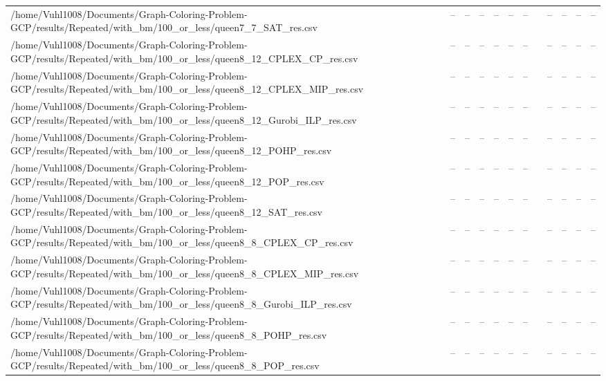 \begin{table}[htbp]
\begin{tabular}{llllllllllll}
/home/Vuhl1008/Documents/Graph-Coloring-Problem-GCP/results/Repeated/with\_bm/100\_or\_less/queen7\_7\_SAT\_res.csv & -- & -- & -- & -- & -- & -- & {} & -- & -- & -- & -- \\
/home/Vuhl1008/Documents/Graph-Coloring-Problem-GCP/results/Repeated/with\_bm/100\_or\_less/queen8\_12\_CPLEX\_CP\_res.csv & -- & -- & -- & -- & -- & -- & {} & -- & -- & -- & -- \\
/home/Vuhl1008/Documents/Graph-Coloring-Problem-GCP/results/Repeated/with\_bm/100\_or\_less/queen8\_12\_CPLEX\_MIP\_res.csv & -- & -- & -- & -- & -- & -- & {} & -- & -- & -- & -- \\
/home/Vuhl1008/Documents/Graph-Coloring-Problem-GCP/results/Repeated/with\_bm/100\_or\_less/queen8\_12\_Gurobi\_ILP\_res.csv & -- & -- & -- & -- & -- & -- & {} & -- & -- & -- & -- \\
/home/Vuhl1008/Documents/Graph-Coloring-Problem-GCP/results/Repeated/with\_bm/100\_or\_less/queen8\_12\_POHP\_res.csv & -- & -- & -- & -- & -- & -- & {} & -- & -- & -- & -- \\
/home/Vuhl1008/Documents/Graph-Coloring-Problem-GCP/results/Repeated/with\_bm/100\_or\_less/queen8\_12\_POP\_res.csv & -- & -- & -- & -- & -- & -- & {} & -- & -- & -- & -- \\
/home/Vuhl1008/Documents/Graph-Coloring-Problem-GCP/results/Repeated/with\_bm/100\_or\_less/queen8\_12\_SAT\_res.csv & -- & -- & -- & -- & -- & -- & {} & -- & -- & -- & -- \\
/home/Vuhl1008/Documents/Graph-Coloring-Problem-GCP/results/Repeated/with\_bm/100\_or\_less/queen8\_8\_CPLEX\_CP\_res.csv & -- & -- & -- & -- & -- & -- & {} & -- & -- & -- & -- \\
/home/Vuhl1008/Documents/Graph-Coloring-Problem-GCP/results/Repeated/with\_bm/100\_or\_less/queen8\_8\_CPLEX\_MIP\_res.csv & -- & -- & -- & -- & -- & -- & {} & -- & -- & -- & -- \\
/home/Vuhl1008/Documents/Graph-Coloring-Problem-GCP/results/Repeated/with\_bm/100\_or\_less/queen8\_8\_Gurobi\_ILP\_res.csv & -- & -- & -- & -- & -- & -- & {} & -- & -- & -- & -- \\
/home/Vuhl1008/Documents/Graph-Coloring-Problem-GCP/results/Repeated/with\_bm/100\_or\_less/queen8\_8\_POHP\_res.csv & -- & -- & -- & -- & -- & -- & {} & -- & -- & -- & -- \\
/home/Vuhl1008/Documents/Graph-Coloring-Problem-GCP/results/Repeated/with\_bm/100\_or\_less/queen8\_8\_POP\_res.csv & -- & -- & -- & -- & -- & -- & {} & -- & -- & -- & -- \\

\end{tabular}
\end{table}
